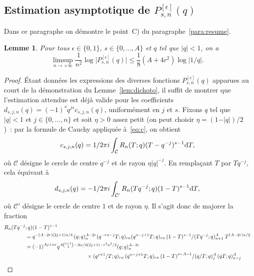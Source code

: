 \documentclass[12pt]{amsart}
\newcommand{\io}{\infty}
\newcommand{\dd}{\textup{d}}
\newcommand{\ep}{\epsilon}
\newtheorem{lem}{Lemme}
\theoremstyle{remark}
\numberwithin{equation}{section}
\begin{document}
\subsection{Estimation asymptotique de $P_{s,n}^{[\ep]}(q)$}
\label{sec:P}
Dans ce paragraphe on d{\'e}montre le point~C) du
paragraphe~\ref{para:resume}.

\begin{lem}\label{lem:asympoly}
Pour tous $\ep\in \{0,1\}$, $s\in\{0, \ldots, A\}$ et 
$q$ tel que $\vert q\vert<1$, on a
$$
\limsup_{n\to +\io}\frac{1}{n^2}\log\vert P_{s,n}^{[\ep]}(q)\vert \le
\frac18(A+4r^2)\log \vert 1/q\vert.
$$
\end{lem}
\begin{proof}
{\'E}tant donn{\'e}es les expressions des diverses fonctions $P_{s,n}^{[\ep]}(q)$ 
apparues au court de  la d{\'e}monstration du Lemme~\ref{lem:dichoto}, 
il suffit de montrer que l'estimation attendue est d{\'e}j{\`a} valide pour les coefficients
$d_{s,j,n}(q)=(-1)^sq^{js}c_{s,j,n}(q)$, uniform{\'e}ment en $j$ et $s$.  
Fixons $q$ tel que $\vert q\vert <1$ et $j\in\{0,\ldots,n\}$ et  
soit $\eta>0$ assez petit
(on peut choisir $\eta=(1-\vert q\vert)/2$)~: 
par la formule de Cauchy
appliqu{\'e}e {\`a}~\eqref{eq:c}, on obtient 
$$
c_{s,j,n}(q)
=\frac{1}{2\pi i}\int_{\mathcal{C}}R_n(T;q)(T-q^{-j})^{s-1}\dd T,
$$
o{\`u} $\mathcal{C}$ d{\'e}signe le cercle de centre $q^{-j}$ et de rayon
$\eta\vert q\vert^{-j}$. En rempla\c cant $T$ par $Tq^{-j}$, cela {\'e}quivaut {\`a}
$$
d_{s,j,n}(q)
=-\frac{1}{2\pi i}\int_{\mathcal{C'}}R_n(Tq^{-j};q)
(1-T)^{s-1}\dd T,
$$
o{\`u} $\mathcal{C'}$ 
d{\'e}signe le cercle de centre $1$ et de rayon
$\eta$. 
Il s'agit donc de majorer la fraction 
\begin{align}
\label{eq:Rn}
R_n(Tq^{-j}&;q)(1-T)^{s-1}\\
\notag
&= q^{-(A-2r)(2j+1)n/4}\,(q;q)_n^{A-2r}
\frac{(q^{-rn-j}T;q)_{rn}(q^{n-j+1}T;q)_{rn}\,(1-T)^{s-1}}
{(Tq^{-j};q)_{n+1}^{A}}\;
T^{(A-2r)n/2}\\
\notag
&={\left( -1 \right) }^{Aj+ n r} 
q^{A\binom {j+1}2- \frac{A n}{4} (2j+1) - \frac{ r^2n^2}{2}} 
 ({\let \over / \def\frac#1#2{#1 / #2} q}; q) _{n} ^{A - 2 r}\\
\notag
&\kern4cm
\times
 \frac{
     ({\let \over / \def\frac#1#2{#1 / #2} \frac{q^ {j+1}}{T}};
      q) _{rn} \,({\let \over / \def\frac#1#2{#1 / #2} q^ {n -
      j + 1} T}; q) _{rn}\,
     {\left( 1 - T \right) }^{ s-A-1}  }
{({\let \over / \def\frac#1#2{#1 / #2}
        \frac{q}{T}}; q) _{j} ^A\,
     ({\let \over / \def\frac#1#2{#1 / #2} q T}; q) _{n-j} ^A}

\end{align}
\end{proof}
\end{document}
